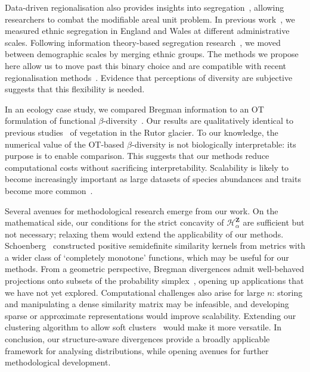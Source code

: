 \documentclass[aps,pre,floats,floatfix,superscriptaddress,twocolumn,final,10pt]{revtex4-2}
\theoremstyle{definition}
\renewcommand{\vec}[1]{\mathbf{#1}}
\newcommand{\entropyname}[2]{\mathcal{H}^{#1}_{#2}}
\begin{document}
Data-driven regionalisation also provides insights into segregation~\cite{Lee2008}, allowing researchers to combat the modifiable areal unit problem. In previous work~\cite{Sahasrabuddhe2025}, we measured ethnic segregation in England and Wales at different administrative scales. Following information theory-based segregation research~\cite{Reardon2002, Mora2011}, we moved between demographic scales by merging ethnic groups. The methods we propose here allow us to move past this binary choice and are compatible with recent regionalisation methods~\cite{Chodrow2017}. Evidence that perceptions of diversity are subjective~\cite{Unzueta2010, Bauman2014} suggests that this flexibility is needed.


In an ecology case study, we compared Bregman information to an OT formulation of functional $\beta$-diversity~\cite{Gregorius2003, Ricotta2021}. Our results are qualitatively identical to previous studies~\cite{Ricotta2021, Ricotta2024} of vegetation in the Rutor glacier. To our knowledge, the numerical value of the OT-based $\beta$-diversity is not biologically interpretable: its purpose is to enable comparison. This suggests that our methods reduce computational costs without sacrificing interpretability. Scalability is likely to become increasingly important as large datasets of species abundances and traits become more common~\cite{Jones2009, Tobias2022}.


Several avenues for methodological research emerge from our work. On the mathematical side, our conditions for the strict concavity of $\entropyname{\vec{Z}}{\alpha}$ are sufficient but not necessary; relaxing them would extend the applicability of our methods. Schoenberg~\cite{Schoenberg1938} constructed positive semidefinite similarity kernels from metrics with a wider class of `completely monotone' functions, which may be useful for our methods. From a geometric perspective, Bregman divergences admit well-behaved projections onto subsets of the probability simplex~\cite{Dhillon2008}, opening up applications that we have not yet explored. Computational challenges also arise for large $n$: storing and manipulating a dense similarity matrix may be infeasible, and developing sparse or approximate representations would improve scalability. Extending our clustering algorithm to allow soft clusters~\cite{Banerjee2004} would make it more versatile. In conclusion, our structure-aware divergences provide a broadly applicable framework for analysing distributions, while opening avenues for further methodological development.
\end{document}
